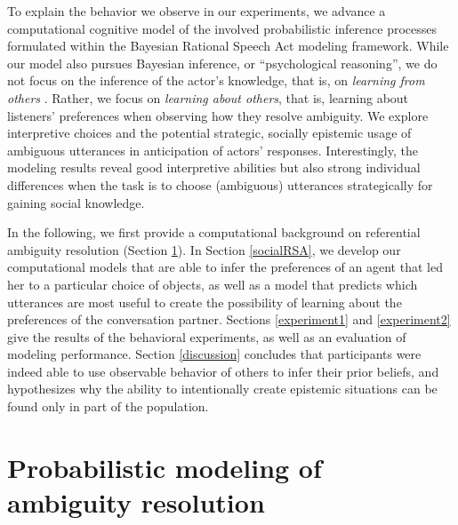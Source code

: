 \documentclass[11pt,a4paper]{article}
\begin{document}
To explain the behavior we observe in our experiments, we advance a computational cognitive model of the involved probabilistic inference processes formulated within the Bayesian Rational Speech Act modeling framework. 
While our model also pursues Bayesian inference, or ``psychological reasoning'', we do not focus on the inference of the actor's knowledge, that is, on \emph{learning from others} \cite{shafto2012learning}.
Rather, we focus on \emph{learning about others}, that is, learning about listeners' preferences when observing how they resolve ambiguity. 
We explore interpretive choices and the potential strategic, socially epistemic usage of ambiguous utterances in anticipation of actors' responses. 
Interestingly, the modeling results reveal good interpretive abilities but also strong individual differences when the task is to choose (ambiguous) utterances strategically for gaining social knowledge. 

In the following, we first provide a computational background on referential ambiguity resolution (Section \ref{modelingTheory}).
In Section \ref{socialRSA}, we develop our computational models that are able to infer the preferences of an agent that led her to a particular choice of objects, as well as a model that predicts which utterances are most useful to create the possibility of learning about the preferences of the conversation partner. 
Sections \ref{experiment1} and \ref{experiment2} give the results of the behavioral experiments, as well as an evaluation of modeling performance. 
Section \ref{discussion} concludes that participants were indeed able to use observable behavior of others to infer their prior beliefs, and hypothesizes why the ability to intentionally create epistemic situations can be found only in part of the population.


\section{Probabilistic modeling of ambiguity resolution} \label{modelingTheory}
\end{document}
